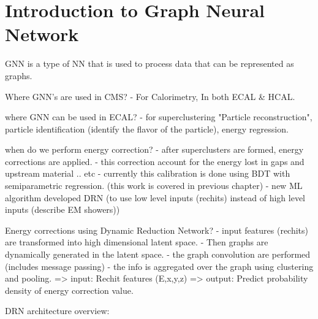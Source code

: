
\section{Introduction to Graph Neural Network}
GNN is a type of NN that is used to process data that can be represented as graphs.

Where GNN's are used in CMS?
- For Calorimetry, In both ECAL & HCAL.


 where GNN can be used in ECAL?
- for superclustering "Particle reconstruction", particle identification (identify the flavor of the particle), energy regression. 

when do we perform energy correction?
- after superclusters are formed, energy corrections are applied.
- this correction account for the energy lost in gaps and upstream material .. etc
-  currently this calibration is done using BDT with semiparametric regression. (this work is covered in previous chapter)
-  new ML algorithm developed DRN (to use low level inputs (rechits) instead of high level inputs (describe EM showers))

Energy corrections using Dynamic Reduction Network?
- input features (rechits) are transformed into high dimensional latent space.
-  Then graphs are dynamically generated in the latent space.
-  the graph convolution are performed (includes message passing)
-  the info is aggregated over the graph using clustering and pooling.
 => input: Rechit features (E,x,y,z) => output: Predict probability density of energy correction value.



DRN architecture overview:

